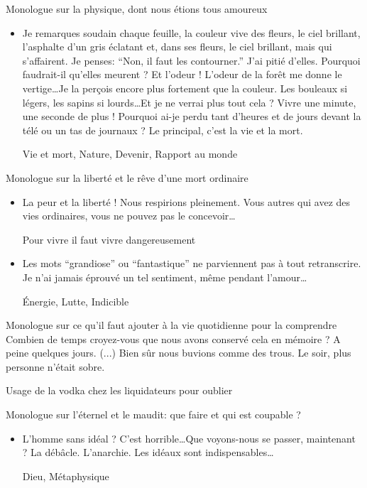 \documentclass[french,a4paper,11pt,answers]{exam}
\newcommand{\cit}[2]{\og #1 \fg{} \begin{solution}{ #2 }\end{solution}} %
\begin{document}
	\begin{cadre}{Monologue sur la physique{,} dont nous étions tous amoureux}
		\begin{itemize}
			\item \cit{Je remarques soudain chaque feuille, la couleur vive des fleurs, le ciel brillant, l'asphalte d'un gris éclatant et, dans ses fleurs, le ciel brillant, mais qui s'affairent. Je penses: “Non, il faut les contourner.'' J'ai pitié d'elles. Pourquoi faudrait-il qu'elles meurent ? Et l'odeur ! L'odeur de la forêt me donne le vertige\ldots Je la perçois encore plus fortement que la couleur. Les bouleaux si légers, les sapins si lourds\ldots Et je ne verrai plus tout cela ? Vivre une minute, une seconde de plus ! Pourquoi ai-je perdu tant d'heures et de jours devant la télé ou un tas de journaux ? Le principal, c'est la vie et la mort.}
				{Vie et mort, Nature, Devenir, Rapport au monde}
		\end{itemize}
	\end{cadre}
	
	\begin{cadre}{Monologue sur la liberté et le rêve d'une mort ordinaire}
		\begin{itemize}
			\item \cit{La peur et la liberté ! Nous respirions pleinement. Vous autres qui avez des vies ordinaires, vous ne pouvez pas le concevoir\ldots}
				{Pour vivre il faut vivre dangereusement}
			\item \cit{Les mots “grandiose'' ou “fantastique'' ne parviennent pas à tout retranscrire. Je n'ai jamais éprouvé un tel sentiment, même pendant l'amour\ldots}
				{Énergie, Lutte, Indicible}
		\end{itemize}
	\end{cadre}

	\begin{cadre}{Monologue sur ce qu'il faut ajouter à la vie quotidienne pour la comprendre}
		\cit {Combien de temps croyez-vous que nous avons conservé cela en mémoire ? A peine quelques jours. (...) Bien sûr nous buvions comme des trous. Le soir, plus personne n'était sobre.}
		{Usage de la vodka chez les liquidateurs pour oublier}
	\end{cadre}
	
	\begin{cadre}{Monologue sur l'éternel et le maudit: que faire et qui est coupable ?}
		\begin{itemize}
			\item \cit{L'homme sans idéal ? C'est horrible\ldots Que voyons-nous se passer, maintenant ? La débâcle. L'anarchie. Les idéaux sont indispensables\ldots}
				{Dieu, Métaphysique}
		\end{itemize}
	\end{cadre}
	
\end{document}
